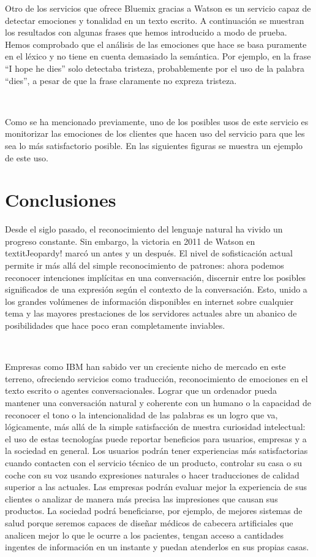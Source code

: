 \documentclass[paper=a4, fontsize=10pt]{scrartcl} %
\numberwithin{equation}{section} %
\numberwithin{figure}{section} %
\numberwithin{table}{section} %
\begin{document}
Otro de los servicios que ofrece Bluemix gracias a Watson es un servicio capaz de detectar emociones y tonalidad en un texto escrito. A continuación se muestran los resultados con algunas frases que hemos introducido a modo de prueba. Hemos comprobado que el análisis de las emociones que hace se basa puramente en el léxico y no tiene en cuenta demasiado la semántica. Por ejemplo, en la frase ``I hope he dies'' solo detectaba tristeza, probablemente por el uso de la palabra ``dies'', a pesar de que la frase claramente no expreza tristeza.

\

Como se ha mencionado previamente, uno de los posibles usos de este servicio es monitorizar las emociones de los clientes que hacen uso del servicio para que les sea lo más satisfactorio posible. En las siguientes figuras se muestra un ejemplo de este uso.

\section{Conclusiones}

Desde el siglo pasado, el reconocimiento del lenguaje natural ha vivido un progreso constante. Sin embargo, la victoria en 2011 de Watson en textit{Jeopardy!} marcó un antes y un después. El nivel de sofisticación actual permite ir más allá del simple reconocimiento de patrones: ahora podemos reconocer intenciones implícitas en una conversación, discernir entre los posibles significados de una expresión según el contexto de la conversación. Esto, unido a los grandes volúmenes de información disponibles en internet sobre cualquier tema y las mayores prestaciones de los servidores actuales abre un abanico de posibilidades que hace poco eran completamente inviables. 

\

Empresas como IBM han sabido ver un creciente nicho de mercado en este terreno, ofreciendo servicios como traducción, reconocimiento de emociones en el texto escrito o agentes conversacionales. Lograr que un ordenador pueda mantener una conversación natural y coherente con un humano o la capacidad de reconocer el tono o la intencionalidad de las palabras es un logro que va, lógicamente, más allá de la simple satisfacción de nuestra curiosidad intelectual: el uso de estas tecnologías puede reportar beneficios para usuarios, empresas y a la sociedad en general. Los usuarios podrán tener experiencias más satisfactorias cuando contacten con el servicio técnico de un producto, controlar su casa o su coche con su voz usando expresiones naturales o hacer traducciones de calidad superior a las actuales. Las empresas podrán evaluar mejor la experiencia de sus clientes o analizar de manera más precisa las impresiones que causan sus productos. La sociedad podrá beneficiarse, por ejemplo, de mejores sistemas de salud porque seremos capaces de diseñar médicos de cabecera artificiales que analicen mejor lo que le ocurre a los pacientes, tengan acceso a cantidades ingentes de información en un instante y puedan atenderlos en sus propias casas.
\end{document}
